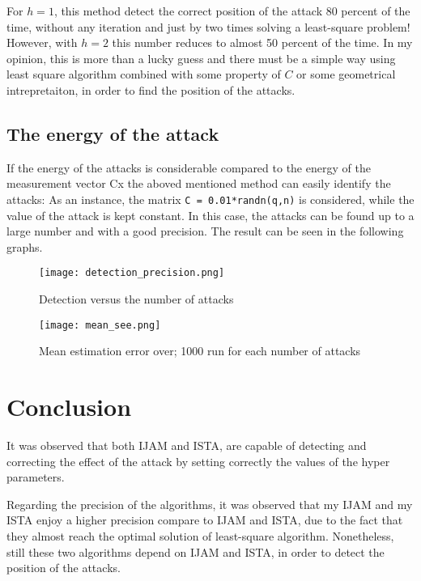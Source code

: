 For $h = 1$, this method detect the correct position of the attack 80 percent of the time, without any iteration and just by two times solving a least-square problem! However, with $h = 2$ this number reduces to almost 50 percent of the time. In my opinion, this is more than a lucky guess and there must be a simple way using least square algorithm combined with some property of $C$ or some geometrical intrepretaiton, in order to find the position of the attacks.
\subsection{The energy of the attack}
If the energy of the attacks is considerable compared to the energy of the measurement vector Cx the aboved mentioned method can easily identify the attacks:
As an instance, the matrix \texttt{C = 0.01*randn(q,n)} is considered, while the value of the attack is kept constant. In this case, the attacks can be found up to a large number and with a good precision. The result can be seen in the following graphs.
\begin{figure}[H] %
    \centering
    \texttt{[image: detection\_precision.png]} %
    \caption{Detection versus the number of attacks}
    \label{fig:example}
\end{figure}

\begin{figure}[H] %
    \centering
    \texttt{[image: mean\_see.png]} %
    \caption{Mean estimation error over; 1000 run for each number of attacks}
    \label{fig:example}
\end{figure}


\section{Conclusion}
It was observed that both IJAM and ISTA, are capable of detecting and correcting the effect of the attack by setting correctly the values of the hyper parameters. 

Regarding the precision of the algorithms, it was observed that my IJAM and my ISTA enjoy a higher precision compare to IJAM and ISTA, due to the fact that they almost reach the optimal solution of least-square algorithm. Nonetheless, still these two algorithms depend on IJAM and ISTA, in order to detect the position of the attacks.

